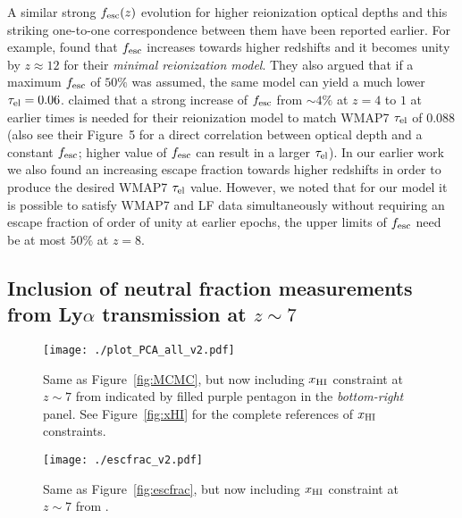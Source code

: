 \documentclass[useAMS,usenatbib]{mnras}
\begin{document}
A similar strong $f_{\rm esc}(z)$ evolution for higher reionization optical depths and
this striking one-to-one correspondence between them have been reported earlier.
For example, \cite{2012ApJ...746..125H} found that $f_{\rm esc}$ increases towards higher redshifts and it
becomes unity by $z\approx12$ for their {\it minimal reionization model}. They also argued that if a maximum
$f_{\rm esc}$ of $50\%$ was assumed, the same model can yield a much lower $\tau_{\rm el}=0.06$.
\cite{2012MNRAS.423..862K} claimed that a strong increase of $f_{\rm esc}$ from $\sim 4\%$ at $z=4$ to
$1$ at earlier times is needed for their reionization model to match WMAP7 $\tau_{\rm el}$ of $0.088$
(also see their Figure~5 for a direct correlation between optical depth and a constant $f_{\rm esc}$;
higher value of $f_{\rm esc}$ can result in a larger $\tau_{\rm el}$). In our earlier work \citep{mitra3}
we also found an increasing escape fraction towards higher redshifts in order to produce the desired
WMAP7 $\tau_{\rm el}$ value. However, we noted that for our model it is possible to satisfy WMAP7
and LF data simultaneously without requiring an escape fraction of order of unity at earlier epochs,
the upper limits of $f_{\rm esc}$ need be at most $50\%$ at $z=8$. 

\subsection{Inclusion of neutral fraction measurements from Ly$\alpha$ transmission at $z\sim7$}
\label{sec:LAE}

\begin{figure*}
\centering
  \texttt{[image: ./plot\_PCA\_all\_v2.pdf]}
  \caption{Same as Figure~\ref{fig:MCMC}, but now including $x_{\rm HI}$ constraint at $z\sim7$
  from \citet{2018ApJ...856....2M} indicated by filled purple pentagon in the {\it bottom-right}
  panel. See Figure~\ref{fig:xHI} for the complete references of $x_{\rm HI}$ constraints.}
\label{fig:MCMCv2}
\end{figure*}

\begin{figure}
\centering
  \texttt{[image: ./escfrac\_v2.pdf]}
  \caption{Same as Figure~\ref{fig:escfrac}, but now including $x_{\rm HI}$ constraint at $z\sim7$ from \citet{2018ApJ...856....2M}.}
\label{fig:escfracv2}
\end{figure}
\end{document}

